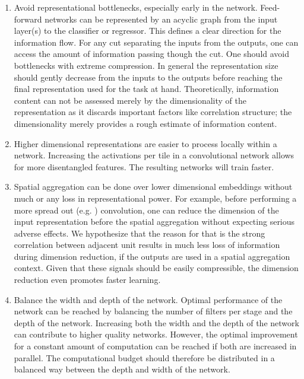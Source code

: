\documentclass[10pt,twocolumn,letterpaper]{article}
\begin{document}
\begin{enumerate}
  \item Avoid representational bottlenecks, especially early in the network. Feed-forward networks can be represented by an acyclic graph from the input layer(s) to the classifier or regressor. This defines a clear direction for the information flow. For any cut separating the inputs from the outputs, one can access the amount of information passing though the cut. One should avoid bottlenecks with extreme compression. In general the representation size should gently decrease from the inputs to the outputs before reaching the final representation used for the task at hand. Theoretically, information content can not be assessed merely by the dimensionality of the representation as it discards important factors like correlation structure; the dimensionality merely provides a rough estimate of information content. \label{nobottlenecks}
  \item Higher dimensional representations are easier to process locally within a network. Increasing the activations per tile in a convolutional network allows for more disentangled features. The resulting networks will train faster. \label{highdim}
  \item Spatial aggregation can be done over lower dimensional embeddings without much or any loss in representational power. For example, before performing a more spread out (e.g. ) convolution, one can reduce the dimension of the input representation before the spatial aggregation without expecting serious adverse effects. We hypothesize that the reason for that is the strong correlation between adjacent unit results in much less loss of information during dimension reduction, if the outputs are used in a spatial aggregation context. Given that these signals should be easily compressible, the dimension reduction even promotes faster learning. \label{lowdim}
\item Balance the width and depth of the network. Optimal performance of the network can be reached by balancing the number of filters per stage and the depth of the network. Increasing both the width and the depth of the network can contribute to higher quality networks. However, the optimal improvement for a constant amount of computation can be reached if both are increased in parallel. The computational budget should therefore be distributed in a balanced way between the depth and width of the network. \label{balance}
\end{enumerate}
\end{document}
